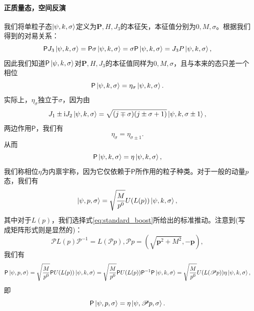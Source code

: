 \paragraph{正质量态，空间反演}
我们将单粒子态$\ket{\psi ,k,\sigma }$定义为$\boldsymbol{P} ,H,J_{3}$的本征矢，本征值分别为$0,M,\sigma $。根据我们得到的对易关系：
\begin{equation*}
	\mathsf{P} J_{3}\ket{\psi ,k,\sigma } =\mathsf{P} \sigma \ket{\psi ,k,\sigma } =\sigma \mathsf{P}\ket{\psi ,k,\sigma } =J_{3} P\ket{\psi ,k,\sigma } ,
\end{equation*}
因此我们知道$\mathsf{P}\ket{\psi ,k,\sigma }$对$\boldsymbol{P} ,H,J_{3}$的本征值同样为$0,M,\sigma $，且与本来的态只差一个相位
\begin{equation*}
	\mathsf{P}\ket{\psi ,k,\sigma } =\eta _{\sigma }\ket{\psi ,k,\sigma } .
\end{equation*}
实际上，$\eta _{\sigma }$独立于$\sigma $，因为由
\begin{equation*}
	J_{1} \pm \mathrm{i} J_{2}\ket{\psi ,k,\sigma } =\sqrt{( j\mp \sigma )( j\pm \sigma +1)}\ket{\psi ,k,\sigma \pm 1} ,
\end{equation*}
两边作用$\mathsf{P}$，我们有
\begin{equation*}
	\eta _{\sigma } =\eta _{\sigma \pm 1} .
\end{equation*}
从而
\begin{equation*}
	\mathsf{P}\ket{\psi ,k,\sigma } =\eta \ket{\psi ,k,\sigma } ,
\end{equation*}
我们称相位$\eta $为内禀宇称，因为它仅依赖于$\mathsf{P}$所作用的粒子种类。对于一般的动量$p$态，我们有
\begin{equation*}
	\ket{\psi ,p,\sigma } =\sqrt{\frac{M}{p^{0}}} U( L( p))\ket{\psi ,k,\sigma } ,
\end{equation*}
其中对于$L( p)$，我们选择式\ref{eq:standard_boost}所给出的标准推动。注意到(写成矩阵形式则是显然的)：
\begin{equation*}
	\mathscr{P} L( p)\mathscr{P}^{-1} =L(\mathscr{P} p) ,\mathscr{P} p=\left(\sqrt{\boldsymbol{p}^{2} +M^{2}} ,-\boldsymbol{p}\right) ,
\end{equation*}
我们有
\begin{equation*}
	\mathsf{P}\ket{\psi ,p,\sigma } =\sqrt{\frac{M}{p^{0}}}\mathsf{P} U( L( p))\ket{\psi ,k,\sigma } =\sqrt{\frac{M}{p^{0}}}\mathsf{P} U( L( p))\mathsf{P}^{-1}\mathsf{P}\ket{\psi ,k,\sigma } =\sqrt{\frac{M}{p^{0}}} U( L(\mathscr{P} p)) \eta \ket{\psi ,k,\sigma } ,
\end{equation*}
即
\begin{equation*}
	\mathsf{P}\ket{\psi ,p,\sigma } =\eta \ket{\psi ,\mathscr{P} p,\sigma } .
\end{equation*}

